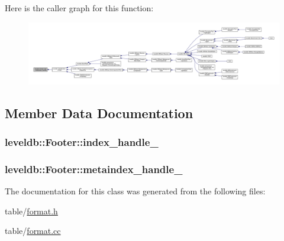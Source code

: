 Here is the caller graph for this function\+:
\nopagebreak
\begin{figure}[H]
\begin{center}
\leavevmode
\includegraphics[width=350pt]{classleveldb_1_1_footer_ac937207010f61550c703b2d732422566_icgraph}
\end{center}
\end{figure}




\subsection{Member Data Documentation}
\hypertarget{classleveldb_1_1_footer_ab930d9087cd95d58531d7698354f0b7b}{}
\subsubsection[{index\+\_\+handle\+\_\+}]{ leveldb\+::\+Footer\+::index\+\_\+handle\+\_\+\hspace{0.3cm}{\ttfamily [private]}}\label{classleveldb_1_1_footer_ab930d9087cd95d58531d7698354f0b7b}
\hypertarget{classleveldb_1_1_footer_acd0ebf81829a0717e2dc832638fc0558}{}
\subsubsection[{metaindex\+\_\+handle\+\_\+}]{ leveldb\+::\+Footer\+::metaindex\+\_\+handle\+\_\+\hspace{0.3cm}{\ttfamily [private]}}\label{classleveldb_1_1_footer_acd0ebf81829a0717e2dc832638fc0558}


The documentation for this class was generated from the following files\+:\begin{DoxyCompactItemize}
\item 
table/\hyperlink{format_8h}{format.\+h}\item 
table/\hyperlink{format_8cc}{format.\+cc}\end{DoxyCompactItemize}
